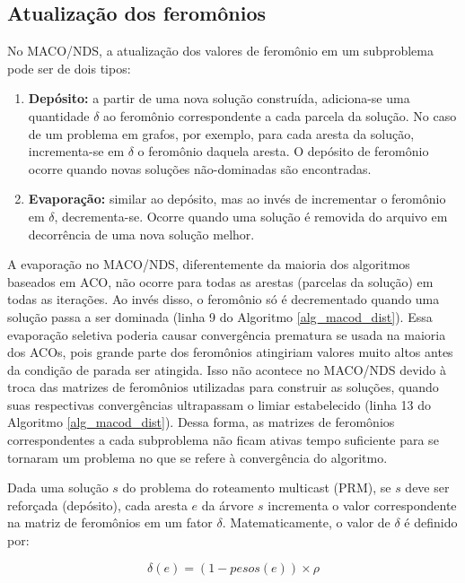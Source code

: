 \subsection{Atualização dos feromônios}
\label{section_macod_pheromones}

No MACO/NDS, a atualização dos valores de feromônio em um subproblema pode ser de dois tipos:

\begin{enumerate}
	\item \textbf{Depósito:} a partir de uma nova solução construída, adiciona-se uma quantidade $\delta$ ao feromônio correspondente a cada parcela da solução. No caso de um problema em grafos, por exemplo, para cada aresta da solução, incrementa-se em $\delta$ o feromônio daquela aresta. O depósito de feromônio ocorre quando novas soluções não-dominadas são encontradas.
	\item \textbf{Evaporação:} similar ao depósito, mas ao invés de incrementar o feromônio em $\delta$, decrementa-se. Ocorre quando uma solução é removida do arquivo em decorrência de uma nova solução melhor.
\end{enumerate}

A evaporação no MACO/NDS, diferentemente da maioria dos algoritmos baseados em ACO, não ocorre para todas as arestas (parcelas da solução) em todas as iterações. Ao invés disso, o feromônio só é decrementado quando uma solução passa a ser dominada (linha 9 do Algoritmo \ref{alg_macod_dist}). Essa evaporação seletiva poderia causar convergência prematura se usada na maioria dos ACOs, pois grande parte dos feromônios atingiriam valores muito altos antes da condição de parada ser atingida. Isso não acontece no MACO/NDS devido à troca das matrizes de feromônios utilizadas para construir as soluções, quando suas respectivas convergências ultrapassam o limiar estabelecido (linha 13 do Algoritmo \ref{alg_macod_dist}). Dessa forma, as matrizes de feromônios correspondentes a cada subproblema não ficam ativas tempo suficiente para se tornaram um problema no que se refere à convergência do algoritmo.

Dada uma solução $s$ do problema do roteamento multicast (PRM), se $s$ deve ser reforçada (depósito), cada aresta $e$ da árvore $s$ incrementa o valor correspondente na matriz de feromônios em um fator $\delta$. Matematicamente, o valor de $\delta$ é definido por:

\begin{equation}\delta(e) = (1 - pesos(e)) \times \rho\end{equation}

